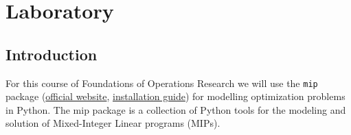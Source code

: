 \section{Laboratory}

\subsection{Introduction}

For this course of Foundations of Operations Research we will use the \texttt{mip} package (\href{https://www.python-mip.com/}{official website}, \href{https://python-mip.readthedocs.io/en/latest/install.html}{installation guide}) for modelling optimization problems in Python. The mip package is a collection of Python tools for the modeling and solution of Mixed-Integer Linear programs (MIPs).
